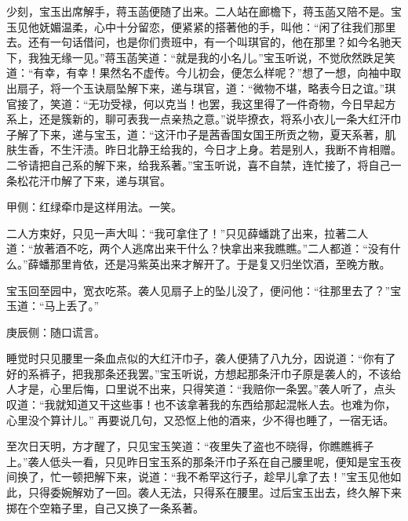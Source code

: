 \begin{parag}
    少刻，宝玉出席解手，蒋玉菡便随了出来。二人站在廊檐下，蒋玉菡又陪不是。宝玉见他妩媚温柔，心中十分留恋，便紧紧的搭著他的手，叫他：“闲了往我们那里去。还有一句话借问，也是你们贵班中，有一个叫琪官的，他在那里？如今名驰天下，我独无缘一见。”蒋玉菡笑道：“就是我的小名儿。”宝玉听说，不觉欣然跌足笑道：“有幸，有幸！果然名不虚传。今儿初会，便怎么样呢？”想了一想，向袖中取出扇子，将一个玉诀扇坠解下来，递与琪官，道：“微物不堪，略表今日之谊。”琪官接了，笑道：“无功受禄，何以克当！也罢，我这里得了一件奇物，今日早起方系上，还是簇新的，聊可表我一点亲热之意。”说毕撩衣，将系小衣儿一条大红汗巾子解了下来，递与宝玉，道：“这汗巾子是茜香国女国王所贡之物，夏天系著，肌肤生香，不生汗渍。昨日北静王给我的，今日才上身。若是别人，我断不肯相赠。二爷请把自己系的解下来，给我系著。”宝玉听说，喜不自禁，连忙接了，将自己一条松花汗巾解了下来，递与琪官。\begin{note}甲侧：红绿牵巾是这样用法。一笑。\end{note}二人方束好，只见一声大叫：“我可拿住了！”只见薛蟠跳了出来，拉著二人道：“放著酒不吃，两个人逃席出来干什么？快拿出来我瞧瞧。”二人都道：“没有什么。”薛蟠那里肯依，还是冯紫英出来才解开了。于是复又归坐饮酒，至晚方散。
\end{parag}


\begin{parag}
    宝玉回至园中，宽衣吃茶。袭人见扇子上的坠儿没了，便问他：“往那里去了？”宝玉道：“马上丢了。”\begin{note}庚辰侧：随口谎言。\end{note}睡觉时只见腰里一条血点似的大红汗巾子，袭人便猜了八九分，因说道：“你有了好的系裤子，把我那条还我罢。”宝玉听说，方想起那条汗巾子原是袭人的，不该给人才是，心里后悔，口里说不出来，只得笑道：“我赔你一条罢。”袭人听了，点头叹道：“我就知道又干这些事！也不该拿著我的东西给那起混帐人去。也难为你，心里没个算计儿。” 再要说几句，又恐怄上他的酒来，少不得也睡了，一宿无话。
\end{parag}


\begin{parag}
    至次日天明，方才醒了，只见宝玉笑道：“夜里失了盗也不晓得，你瞧瞧裤子上。”袭人低头一看，只见昨日宝玉系的那条汗巾子系在自己腰里呢，便知是宝玉夜间换了，忙一顿把解下来，说道：“我不希罕这行子，趁早儿拿了去！”宝玉见他如此，只得委婉解劝了一回。袭人无法，只得系在腰里。过后宝玉出去，终久解下来掷在个空箱子里，自己又换了一条系著。
\end{parag}


